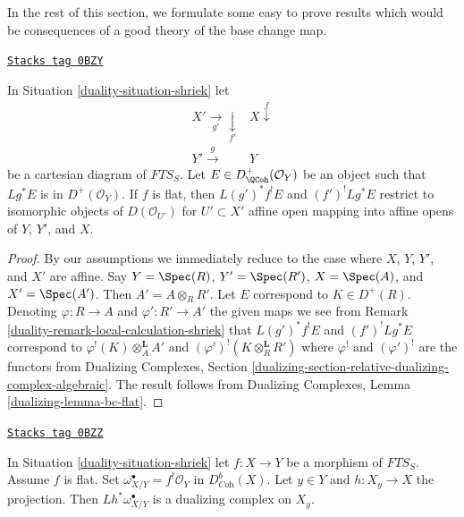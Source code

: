 In the rest of this section, we formulate some easy to prove
results which would be consequences of a good theory of the
base change map.

\begin{lemma}

\label{duality-lemma-base-change-locally}
\href{https://stacks.math.columbia.edu/tag/0BZY}{\texttt{Stacks tag 0BZY}}

In Situation \ref{duality-situation-shriek} let
$$
\begin{array}{cc}X' \underset{g'}{\longrightarrow}\underset{f'}{\downarrow} & X \overset{f}{\downarrow} \\ Y' \overset{g}{\longrightarrow} & Y\end{array}
$$
be a cartesian diagram of $\textit{FTS}_S$.
Let $E \in D^+_\QCoh(\mathcal{O}_Y)$ be an object
such that $Lg^*E$ is in $D^+(\mathcal{O}_Y)$.
If $f$ is flat, then $L(g')^*f^!E$ and $(f')^!Lg^*E$
restrict to isomorphic objects of $D(\mathcal{O}_{U'})$
for $U' \subset X'$ affine open mapping into affine opens of $Y$, $Y'$, and $X$.
\end{lemma}

\begin{proof}

By our assumptions we immediately reduce to the case where
$X$, $Y$, $Y'$, and $X'$ are affine.
Say $Y = \Spec(R)$, $Y' = \Spec(R')$, $X = \Spec(A)$, and $X' = \Spec(A')$.
Then $A' = A \otimes_R R'$. Let
$E$ correspond to $K \in D^+(R)$.
Denoting $\varphi : R \to A$ and $\varphi' : R' \to A'$
the given maps we see from
Remark \ref{duality-remark-local-calculation-shriek}
that $L(g')^*f^!E$ and $(f')^!Lg^*E$ correspond to
$\varphi^!(K) \otimes_A^\mathbf{L} A'$ and
$(\varphi')^!(K \otimes_R^\mathbf{L} R')$
where $\varphi^!$ and $(\varphi')^!$ are the functors from
Dualizing Complexes, Section
\ref{dualizing-section-relative-dualizing-complex-algebraic}.
The result follows from
Dualizing Complexes, Lemma \ref{dualizing-lemma-bc-flat}.
\end{proof}

\begin{lemma}
\label{duality-lemma-relative-dualizing-fibres}
\href{https://stacks.math.columbia.edu/tag/0BZZ}{\texttt{Stacks tag 0BZZ}}

In Situation \ref{duality-situation-shriek} let $f : X \to Y$ be a morphism of
$\textit{FTS}_S$. Assume $f$ is flat. Set
$\omega_{X/Y}^\bullet = f^!\mathcal{O}_Y$ in $D^b_{\textit{Coh}}(X)$.
Let $y \in Y$ and $h : X_y \to X$ the projection.
Then $Lh^*\omega_{X/Y}^\bullet$ is a dualizing complex
on $X_y$.
\end{lemma}

